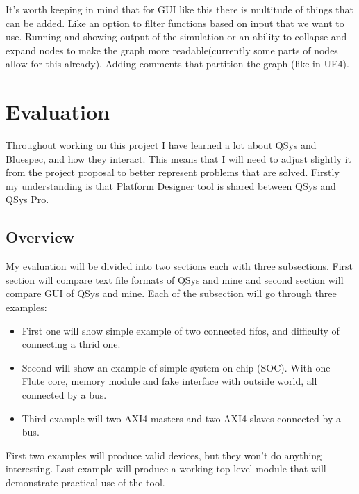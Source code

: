 \documentclass[12pt]{report}
\begin{document}
\begin{tcolorbox}[title=Futher work]
    It's worth keeping in mind that for GUI like this there is multitude of things that can be added. Like an option to filter functions based on input that we want to use. Running and showing output of the simulation or an ability to collapse and expand nodes to make the graph more readable(currently some parts of nodes allow for this already). Adding comments that partition the graph (like in UE4).
\end{tcolorbox}

\chapter{Evaluation}
Throughout working on this project I have learned a lot about QSys and Bluespec, and how they interact. This means that I will need to adjust slightly it from the project proposal to better represent problems that are solved. Firstly my understanding is that Platform Designer tool is shared between QSys and QSys Pro.

\section{Overview}
My evaluation will be divided into two sections each with three subsections. First section will compare text file formats of QSys and mine and second section will compare GUI of QSys and mine.
Each of the subsection will go through three examples:
\begin{itemize}
    \item First one will show simple example of two connected fifos, and difficulty of connecting a thrid one.
    \item Second will show an example of simple system-on-chip (SOC). With one Flute core, memory module and fake interface with outside world, all connected by a bus.
    \item Third example will two AXI4 masters and two AXI4 slaves connected by a bus. 
\end{itemize}
First two examples will produce valid devices, but they won't do anything interesting. Last example will produce a working top level module that will demonstrate practical use of the tool.
\end{document}
